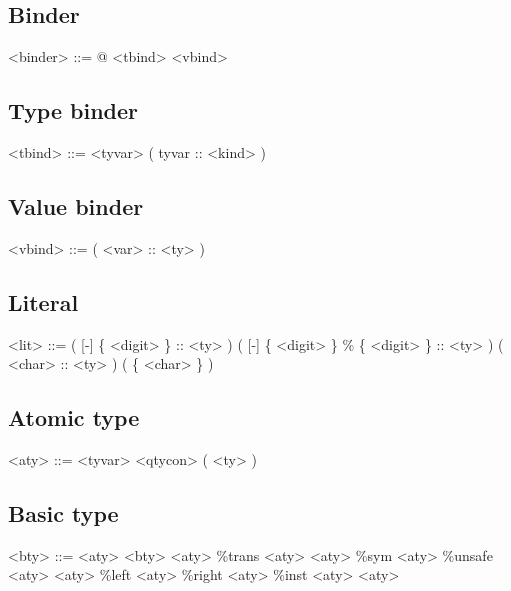 \subsection*{Binder}

\begin{grammar}
<binder> ::= @ <tbind>
        \alt <vbind>
\end{grammar}

\subsection*{Type binder}

\begin{grammar}
<tbind> ::= <tyvar>
       \alt ( tyvar :: <kind> )
\end{grammar}

\subsection*{Value binder}

\begin{grammar}
<vbind> ::= ( <var> :: <ty> )
\end{grammar}

\subsection*{Literal}

\begin{grammar}
<lit> ::= ( [-] \{ <digit> \} :: <ty> )
     \alt ( [-] \{ <digit> \} \% \{ <digit> \} :: <ty> )
     \alt ( <char> :: <ty> )
     \alt ( \{ <char> \} )
\end{grammar}

\subsection*{Atomic type}

\begin{grammar}
<aty> ::= <tyvar>
     \alt <qtycon>
     \alt ( <ty> )
\end{grammar}

\subsection*{Basic type}

\begin{grammar}
<bty> ::= <aty>
     \alt <bty> <aty>
     \alt \%trans <aty> <aty>
     \alt \%sym <aty>
     \alt \%unsafe <aty> <aty>
     \alt \%left <aty>
     \alt \%right <aty>
     \alt \%inst <aty> <aty>
\end{grammar}

